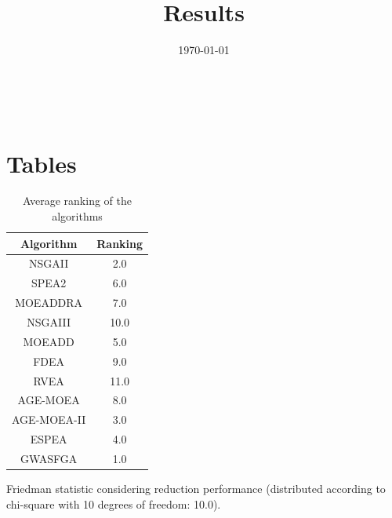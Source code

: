 \documentclass{article}
\title{Results}
\author{}
\date{\today}
\begin{document}
\oddsidemargin 0in \topmargin 0in\maketitle
\
\section{Tables}
\begin{table}[!htp]
\centering
\caption{Average ranking of the algorithms}
\begin{tabular}{c|c}
Algorithm&Ranking\\
\hline
NSGAII&2.0\\
SPEA2&6.0\\
MOEADDRA&7.0\\
NSGAIII&10.0\\
MOEADD&5.0\\
FDEA&9.0\\
RVEA&11.0\\
AGE-MOEA&8.0\\
AGE-MOEA-II&3.0\\
ESPEA&4.0\\
GWASFGA&1.0\\
\end{tabular}
\end{table}


Friedman statistic considering reduction performance (distributed according to chi-square with 10 degrees of freedom: 10.0).
\end{document}

